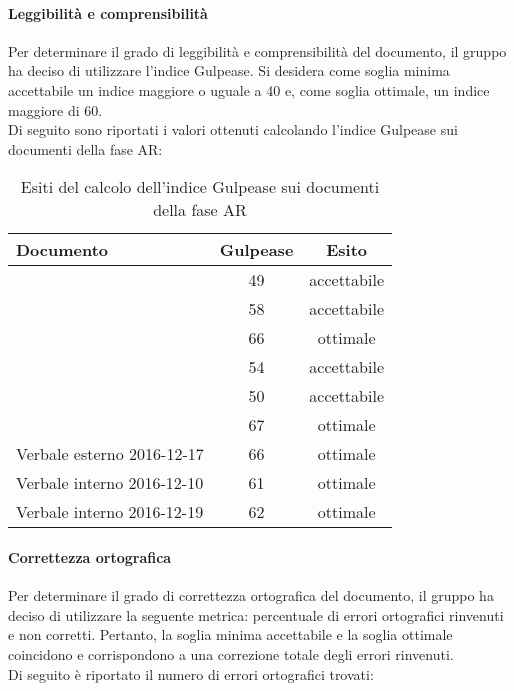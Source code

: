 \documentclass[PianoDiQualifica.tex]{subfiles}
\begin{document}
		\paragraph{Leggibilità e comprensibilità}
		Per determinare il grado di leggibilità e comprensibilità del documento, il gruppo ha deciso di utilizzare l'indice Gulpease. Si desidera come soglia minima accettabile un indice
				maggiore o uguale a 40 e, come soglia ottimale, un indice maggiore di 60.\\
				Di seguito sono riportati i valori ottenuti calcolando l'indice Gulpease sui documenti della fase AR:
				\begin{table}[h]
				\centering
				\begin{tabular}{l c c}
					\hline
					\rule[-0.3cm]{0cm}{0.8cm}
					\textbf{Documento} & \textbf{Gulpease} & \textbf{Esito} \\
					\hline
					\rule[0cm]{0cm}{0.4cm}
					\PPdocRR & 49 & accettabile \\
					\rule[0cm]{0cm}{0.4cm}
					\NPdocRR & 58 & accettabile \\ 
					\rule[0cm]{0cm}{0.4cm}
					\ARdocRR & 66 & ottimale \\ 
					\rule[0cm]{0cm}{0.4cm}
					\PQdocRR & 54 & accettabile \\ 
					\rule[0cm]{0cm}{0.4cm}
					\Gldoc & 50 & accettabile\\ 
					\rule[0cm]{0cm}{0.4cm}
					\SDKdoc & 67 & ottimale \\ 
					\rule[0cm]{0cm}{0.4cm}
					Verbale esterno 2016-12-17 & 66 & ottimale\\ 
					\rule[0cm]{0cm}{0.4cm}
					Verbale interno 2016-12-10 & 61 & ottimale\\ 
					\rule[0cm]{0cm}{0.4cm}
					Verbale interno 2016-12-19 & 62 & ottimale\\ 
					
					\hline
				\end{tabular}
				\caption{Esiti del calcolo dell'indice Gulpease sui documenti della fase AR}
			\end{table}		
		\paragraph{Correttezza ortografica}
		Per determinare il grado di correttezza ortografica del documento, il gruppo ha deciso di utilizzare la seguente metrica: percentuale di errori ortografici rinvenuti e non corretti.
				Pertanto, la soglia minima accettabile e la soglia ottimale coincidono e corrispondono a una correzione totale degli errori rinvenuti.\\
				Di seguito è riportato il numero di errori ortografici trovati:\\
				
\end{document}
